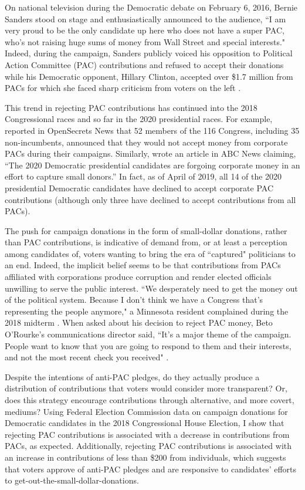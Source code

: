 \documentclass[12pt]{article}
\begin{document}
On national television during the Democratic debate on February 6, 2016, Bernie Sanders stood on stage and enthusiastically announced to the audience, ``I am very proud to be the only candidate up here who does not have a super PAC, who’s not raising huge sums of money from Wall Street and special interests." Indeed, during the campaign, Sanders publicly voiced his opposition to Political Action Committee (PAC) contributions and refused to accept their donations while his Democratic opponent, Hillary Clinton, accepted over \$1.7 million from PACs for which she faced sharp criticism from voters on the left \citep{harper2019, yeheelee2016, seitz-wald2015, bump2016}. 

This trend in rejecting PAC contributions has continued into the 2018 Congressional races and so far in the 2020 presidential races. For example, \citet{evers-hillstrom2018} reported in OpenSecrets News that 52 members of the 116 Congress, including 35 non-incumbents, announced that they would not accept money from corporate PACs during their campaigns. Similarly,  wrote an article in ABC News claiming, ``The 2020 Democratic presidential candidates are forgoing corporate money in an effort to capture small donors.'' In fact, as of April of 2019, all 14 of the 2020 presidential Democratic candidates have declined to accept corporate PAC contributions (although only three have declined to accept contributions from all PACs). 

The push for campaign donations in the form of small-dollar donations, rather than PAC contributions, is indicative of demand from, or at least a perception among candidates of, voters wanting to bring the era of ``captured" politicians to an end. Indeed, the implicit belief seems to be that contributions from PACs affiliated with corporations produce corruption and render elected officials unwilling to serve the public interest. ``We desperately need to get the money out of the political system. Because I don’t think we have a Congress that’s representing the people anymore," a Minnesota resident complained during the 2018 midterm \citep{stockman2018}. When asked about his decision to reject PAC money, Beto O’Rourke's communications director said, ``It’s a major theme of the campaign. People want to know that you are going to respond to them and their interests, and not the most recent check you received" \citep{stockman2018}. 

Despite the intentions of anti-PAC pledges, do they actually produce a distribution of contributions that voters would consider more transparent? Or, does this strategy encourage contributions through alternative, and more covert, mediums? Using Federal Election Commission data on campaign donations for Democratic candidates in the 2018 Congressional House Election, I show that rejecting PAC contributions is associated with a decrease in contributions from PACs, as expected. Additionally, rejecting PAC contributions is associated with an increase in contributions of less than \$200 from individuals, which suggests that voters approve of anti-PAC pledges and are responsive to candidates' efforts to get-out-the-small-dollar-donations.
\end{document}
